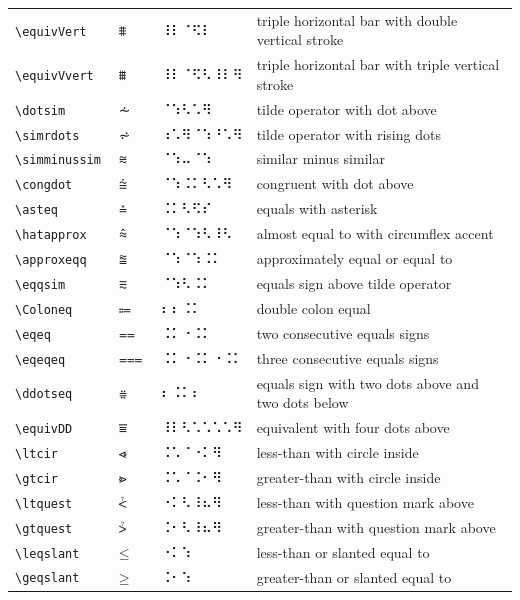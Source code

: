 \documentclass[oneside]{article}
\begin{document}
\begin{longtable}{llll}
\verb|\equivVert| & $\equivVert$ &   ⠸⠇⠈⠫⠇   & {triple horizontal bar with double vertical stroke} \\[2ex]
\verb|\equivVvert| & $\equivVvert$ &   ⠸⠇⠈⠫⠣⠸⠇⠻   & {triple horizontal bar with triple vertical stroke} \\[2ex]
\verb|\dotsim| & $\dotsim$ &   ⠈⠱⠣⠡⠻   & {tilde operator with dot above} \\[2ex]
\verb|\simrdots| & $\simrdots$ &   ⠰⠡⠻⠈⠱⠘⠡⠻   & {tilde operator with rising dots} \\[2ex]
\verb|\simminussim| & $\simminussim$ &   ⠈⠱⠤⠈⠱   & {similar minus similar} \\[2ex]
\verb|\congdot| & $\congdot$ &   ⠈⠱⠨⠅⠣⠡⠻   & {congruent with dot above} \\[2ex]
\verb|\asteq| & $\asteq$ &   ⠨⠅⠣⠫⠎   & {equals with asterisk} \\[2ex]
\verb|\hatapprox| & $\hatapprox$ &   ⠈⠱⠈⠱⠣⠸⠣   & {almost equal to with circumflex accent} \\[2ex]
\verb|\approxeqq| & $\approxeqq$ &   ⠈⠱⠈⠱⠨⠅   & {approximately equal or equal to} \\[2ex]
\verb|\eqqsim| & $\eqqsim$ &   ⠈⠱⠣⠨⠅   & {equals sign above tilde operator} \\[2ex]
\verb|\Coloneq| & $\Coloneq$ &   ⠆⠆⠨⠅   & {double colon equal} \\[2ex]
\verb|\eqeq| & $\eqeq$ &   ⠨⠅⠐⠨⠅   & {two consecutive equals signs} \\[2ex]
\verb|\eqeqeq| & $\eqeqeq$ &   ⠨⠅⠐⠨⠅⠐⠨⠅   & {three consecutive equals signs} \\[2ex]
\verb|\ddotseq| & $\ddotseq$ &   ⠆⠨⠅⠆   & {equals sign with two dots above and two dots below} \\[2ex]
\verb|\equivDD| & $\equivDD$ &   ⠸⠇⠣⠡⠡⠡⠡⠻   & {equivalent with four dots above} \\[2ex]
\verb|\ltcir| & $\ltcir$ &   ⠨⠡⠈⠐⠅⠻   & {less-than with circle inside} \\[2ex]
\verb|\gtcir| & $\gtcir$ &   ⠨⠡⠈⠨⠂⠻   & {greater-than with circle inside} \\[2ex]
\verb|\ltquest| & $\ltquest$ &   ⠐⠅⠣⠸⠦⠻   & {less-than with question mark above} \\[2ex]
\verb|\gtquest| & $\gtquest$ &   ⠨⠂⠣⠸⠦⠻   & {greater-than with question mark above} \\[2ex]
\verb|\leqslant| & $\leqslant$ &   ⠐⠅⠱   & {less-than or slanted equal to} \\[2ex]
\verb|\geqslant| & $\geqslant$ &   ⠨⠂⠱   & {greater-than or slanted equal to} \\[2ex]

\end{longtable}
\end{document}
